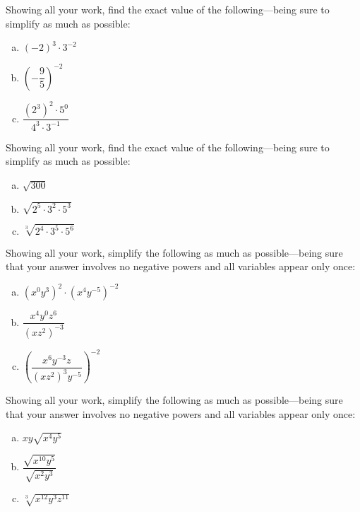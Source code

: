 \documentclass[11pt,letterpaper]{article}
\begin{document}

 Showing all your work, find the exact value of the following---being sure to simplify as much as possible:
	\begin{enumerate}[(a)]
	\item $(-2)^3 \cdot 3^{-2}$
	\item $\left( -\dfrac{9}{5} \right)^{-2}$
	\item $\dfrac{(2^3)^2 \cdot 5^0}{4^3 \cdot 3^{-1}}$
	\end{enumerate}



\newpage



 Showing all your work, find the exact value of the following---being sure to simplify as much as possible:
	\begin{enumerate}[(a)]
	\item $\sqrt{300}$
	\item $\sqrt{2^5 \cdot 3^2 \cdot 5^3}$
	\item $\sqrt[3]{2^{4} \cdot 3^5 \cdot 5^6}$
	\end{enumerate}



\newpage



 Showing all your work, simplify the following as much as possible---being sure that your answer involves no negative powers and all variables appear only once:
	\begin{enumerate}[(a)]
	\item $(x^0 y^3)^2 \cdot (x^4 y^{-5})^{-2}$
	\item $\dfrac{x^{4} y^0 z^6}{(x z^2)^{-3}}$
	\item $\left( \dfrac{x^6 y^{-3} z}{(x z^2)^3 y^{-5}} \right)^{-2}$
	\end{enumerate}



\newpage



 Showing all your work, simplify the following as much as possible---being sure that your answer involves no negative powers and all variables appear only once:
	\begin{enumerate}[(a)]
	\item $xy \sqrt{x^4 y^5}$
	\item $\dfrac{\sqrt{x^{10} y^5}}{\sqrt{x^2 y^3}}$
	\item $\sqrt[3]{x^{12} y^3 z^{11}}$
	\end{enumerate}
\end{document}
